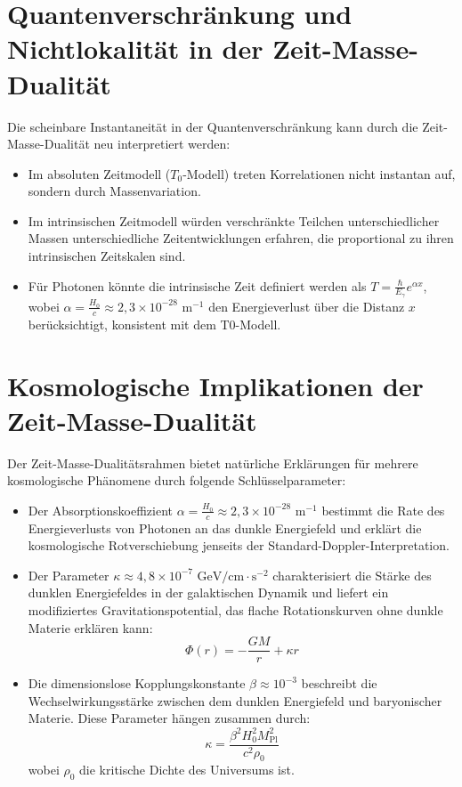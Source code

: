 \documentclass{article}
\begin{document}
	\section{Quantenverschränkung und Nichtlokalität in der Zeit-Masse-Dualität}
	
	Die scheinbare Instantaneität in der Quantenverschränkung kann durch die Zeit-Masse-Dualität neu interpretiert werden:
	
	\begin{itemize}
		\item Im absoluten Zeitmodell ($T_0$-Modell) treten Korrelationen nicht instantan auf, sondern durch Massenvariation.
		\item Im intrinsischen Zeitmodell würden verschränkte Teilchen unterschiedlicher Massen unterschiedliche Zeitentwicklungen erfahren, die proportional zu ihren intrinsischen Zeitskalen sind.
		\item Für Photonen könnte die intrinsische Zeit definiert werden als $T = \frac{\hbar}{E_{\gamma}} e^{\alpha x}$, wobei $\alpha = \frac{H_0}{c} \approx 2{,}3 \times 10^{-28} \text{ m}^{-1}$ den Energieverlust über die Distanz $x$ berücksichtigt, konsistent mit dem T0-Modell.
	\end{itemize}
	
	\section{Kosmologische Implikationen der Zeit-Masse-Dualität}
	
	Der Zeit-Masse-Dualitätsrahmen bietet natürliche Erklärungen für mehrere kosmologische Phänomene durch folgende Schlüsselparameter:
	
	\begin{itemize}
		\item Der Absorptionskoeffizient $\alpha = \frac{H_0}{c} \approx 2{,}3 \times 10^{-28} \text{ m}^{-1}$ bestimmt die Rate des Energieverlusts von Photonen an das dunkle Energiefeld und erklärt die kosmologische Rotverschiebung jenseits der Standard-Doppler-Interpretation.
		
		\item Der Parameter $\kappa \approx 4{,}8 \times 10^{-7} \text{ GeV/cm}\cdot\text{s}^{-2}$ charakterisiert die Stärke des dunklen Energiefeldes in der galaktischen Dynamik und liefert ein modifiziertes Gravitationspotential, das flache Rotationskurven ohne dunkle Materie erklären kann:
		\[
		\Phi(r) = -\frac{GM}{r} + \kappa r
		\]
		
		\item Die dimensionslose Kopplungskonstante $\beta \approx 10^{-3}$ beschreibt die Wechselwirkungsstärke zwischen dem dunklen Energiefeld und baryonischer Materie. Diese Parameter hängen zusammen durch:
		\[
		\kappa = \frac{\beta^2 H_0^2 M_{\text{Pl}}^2}{c^2 \rho_0}
		\]
		wobei $\rho_0$ die kritische Dichte des Universums ist.
	\end{itemize}
	
\end{document}
